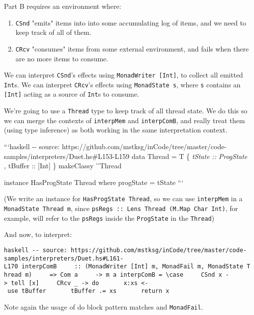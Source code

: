 \documentclass[]{article}
\begin{document}
Part B requires an environment where:

\begin{enumerate}
\tightlist
\item
  \texttt{CSnd} "emits" items into into some accumulating log of items, and we
  need to keep track of all of them.
\item
  \texttt{CRcv} "consumes" items from some external environment, and fails when
  there are no more items to consume.
\end{enumerate}

We can interpret \texttt{CSnd}'s effects using \texttt{MonadWriter\ {[}Int{]}},
to collect all emitted \texttt{Int}s. We can interpret \texttt{CRcv}'s effects
using \texttt{MonadState\ s}, where \texttt{s} contains an \texttt{{[}Int{]}}
acting as a source of \texttt{Int}s to consume.

We're going to use a \texttt{Thread} type to keep track of all thread state. We
do this so we can merge the contexts of \texttt{interpMem} and
\texttt{interpComB}, and really treat them (using type inference) as both
working in the same interpretation context.

```haskell -\/- source:
https://github.com/mstksg/inCode/tree/master/code-samples/interpreters/Duet.hs\#L153-L159
data Thread = T \{ \emph{tState :: ProgState , }tBuffer :: {[}Int{]} \}
makeClassy ''Thread

instance HasProgState Thread where progState = tState ```

(We write an instance for \texttt{HasProgState\ Thread}, so we can use
\texttt{interpMem} in a \texttt{MonadState\ Thread\ m}, since
\texttt{psRegs\ ::\ Lens\textquotesingle{}\ Thread\ (M.Map\ Char\ Int)}, for
example, will refer to the \texttt{psRegs} inside the \texttt{ProgState} in the
\texttt{Thread})

And now, to interpret:

\texttt{haskell\ -\/-\ source:\ https://github.com/mstksg/inCode/tree/master/code-samples/interpreters/Duet.hs\#L161-L170\ interpComB\ \ \ \ \ ::\ (MonadWriter\ {[}Int{]}\ m,\ MonadFail\ m,\ MonadState\ Thread\ m)\ \ \ \ \ =\textgreater{}\ Com\ a\ \ \ \ \ -\textgreater{}\ m\ a\ interpComB\ =\ \textbackslash{}case\ \ \ \ \ CSnd\ x\ -\textgreater{}\ tell\ {[}x{]}\ \ \ \ \ CRcv\ \_\ -\textgreater{}\ do\ \ \ \ \ \ \ x:xs\ \textless{}-\ use\ tBuffer\ \ \ \ \ \ \ tBuffer\ .=\ xs\ \ \ \ \ \ \ return\ x}

Note again the usage of do block pattern matches and \texttt{MonadFail}.
\end{document}
